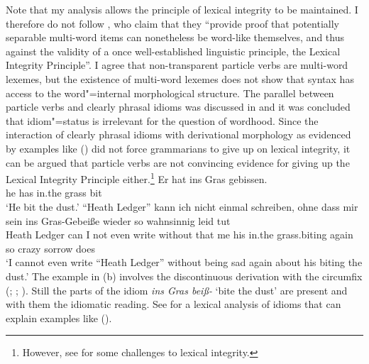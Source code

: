 \begin{exe}
\begin{xlist}[iv.]
\begin{exe}
\begin{xlist}[iv.]
Note that my analysis allows the principle of lexical integrity to be maintained. I therefore do
not follow \citet*[]{CSP2010a}, who claim that they ``provide proof that potentially
  separable multi-word items can nonetheless be word-like themselves, and thus against the validity
  of a once well-established linguistic principle, the Lexical Integrity Principle''. I agree that
non-transparent particle verbs are multi-word lexemes, but the existence of multi-word lexemes does
not show that syntax has access to the word"=internal morphological structure. The parallel between
particle verbs and clearly phrasal idioms was discussed in  and it
was concluded that idiom"=status is irrelevant for the question of wordhood. Since the interaction of
clearly phrasal idioms with derivational morphology as evidenced by examples like () did not
force grammarians to give up on lexical integrity, it can be argued that particle verbs are not
convincing evidence for giving up the Lexical Integrity Principle either.\footnote{%
  However, see  for some challenges to lexical integrity.
}
\eal
\ex
\gll Er hat ins Gras gebissen.\\
     he has in.the grass bit\\
\glt `He bit the dust.'
\ex 
\gll "`Heath Ledger"' kann ich nicht einmal schreiben, ohne dass mir sein ins Gras-Gebeiße wieder so
wahnsinnig leid tut%
\footnotemark\\
    \spacebr{}Heath Ledger can I not even write without that me his in.the grass.biting again so
    crazy sorrow does\\
\glt `I cannot even write ``Heath Ledger'' without being sad again about his biting the dust.'
\zl
The example in (b) involves the discontinuous derivation with the circumfix \gee
(\citealp[Section~3.4.3]{Luedeling2001a}; \citealp[--327, 372--377]{Mueller2002b};
\citealp[Section~2.2.1, Section~5.2.1]{Mueller2003a}). Still the parts of the idiom \emph{ins Gras
  beiß-} `bite the dust' are present and with them the idiomatic reading. See  for a lexical analysis of idioms that can
explain examples like ().



\end{xlist}
\end{exe}
\end{xlist}
\end{exe}
